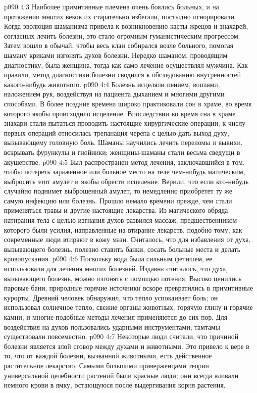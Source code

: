 \vs p090 4:3 \pc Наиболее примитивные племена очень боялись больных, и на протяжении многих веков их старательно избегали, постыдно игнорировали. Когда эволюция шаманизма привела к возникновению касты жрецов и знахарей, согласных лечить болезни, это стало огромным гуманистическим прогрессом. Затем вошло в обычай, чтобы весь клан собирался возле больного, помогая шаману криками изгонять духов болезни. Нередко шаманом, проводящим диагностику, была женщина, тогда как само лечение осуществлял мужчина. Как правило, метод диагностики болезни сводился к обследованию внутренностей какого\hyp{}нибудь животного.
\vs p090 4:4 Болезнь исцеляли пением, воплями, наложением рук, воздействуя на пациента дыханием и многими другими способами. В более поздние времена широко практиковали сон в храме, во время которого якобы происходило исцеление. Впоследствии во время сна в храме знахари стали пытаться проводить настоящие хирургические операции; к числу первых операций относилась трепанация черепа с целью дать выход духу, вызывающему головную боль. Шаманы научились лечить переломы и вывихи, вскрывать фурункулы и гнойники; женщины\hyp{}шаманы стали весьма сведущи в акушерстве.
\vs p090 4:5 Был распространен метод лечения, заключавшийся в том, чтобы потереть зараженное или больное место на теле чем\hyp{}нибудь магическим, выбросить этот амулет и якобы обрести исцеление. Верили, что если кто\hyp{}нибудь случайно поднимет выброшенный амулет, то немедленно приобретет ту же самую инфекцию или болезнь. Прошло немало времени прежде, чем стали применяться травы и другие настоящие лекарства. Из магического обряда натирания тела с целью изгнания духов развился массаж, предшественником которого были усилия, направленные на втирание лекарств, подобно тому, как современные люди втирают в кожу мази. Считалось, что для избавления от духа, вызывающего болезнь, полезно ставить банки, сосать больные места и делать кровопускания.
\vs p090 4:6 Поскольку вода была сильным фетишем, ее использовали для лечения многих болезней. Издавна считалось, что духа, вызывающего болезнь, можно изгонять с помощью потения. Высоко ценились паровые бани; природные горячие источники вскоре превратились в примитивные курорты. Древний человек обнаружил, что тепло успокаивает боль; он использовал солнечное тепло, свежие органы животных, горячую глину и горячие камни, и многие подобные методы лечения применяются до сих пор. Для воздействия на духов пользовались ударными инструментами; тамтамы существовали повсеместно.
\vs p090 4:7 Некоторые люди считали, что причиной болезни является злой сговор между духами и животными. Это привело к вере в то, что от каждой болезни, вызванной животными, есть действенное растительное лекарство. Самыми большими приверженцами теории универсальной целебности растений были красные люди; они всегда вливали немного крови в ямку, остающуюся после выдергивания корня растения.
